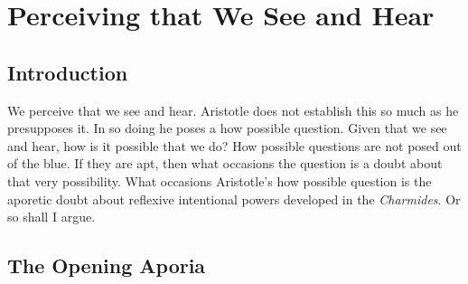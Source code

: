 \chapter{Perceiving that We See and Hear} %
\label{cha:perceiving}

\section{Introduction} %
\label{sec:introduction}

We perceive that we see and hear. Aristotle does not establish this so much as he presupposes it. In so doing he poses a how possible question. Given that we see and hear, how is it possible that we do? How possible questions are not posed out of the blue. If they are apt, then what occasions the question is a doubt about that very possibility. What occasions Aristotle's how possible question is the aporetic doubt about reflexive intentional powers developed in the \emph{Charmides}. Or so shall I argue.



\section{The Opening Aporia} %
\label{sec:the_opening_aporia}




